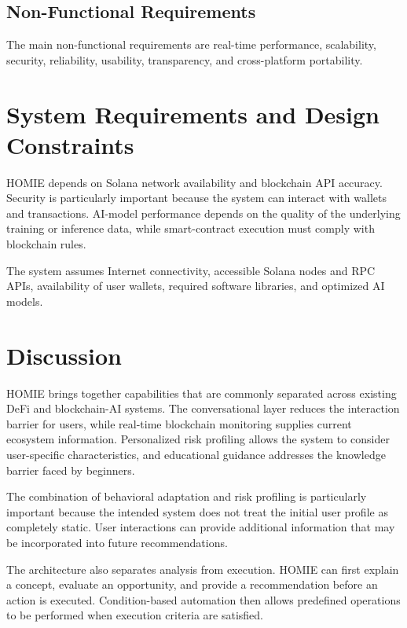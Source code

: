 \documentclass[conference]{IEEEtran}
\begin{document}
\subsection{Non-Functional Requirements}

The main non-functional requirements are real-time performance, scalability, security, reliability, usability, transparency, and cross-platform portability.

\section{System Requirements and Design Constraints}

HOMIE depends on Solana network availability and blockchain API accuracy. Security is particularly important because the system can interact with wallets and transactions. AI-model performance depends on the quality of the underlying training or inference data, while smart-contract execution must comply with blockchain rules.

The system assumes Internet connectivity, accessible Solana nodes and RPC APIs, availability of user wallets, required software libraries, and optimized AI models.

\section{Discussion}

HOMIE brings together capabilities that are commonly separated across existing DeFi and blockchain-AI systems. The conversational layer reduces the interaction barrier for users, while real-time blockchain monitoring supplies current ecosystem information. Personalized risk profiling allows the system to consider user-specific characteristics, and educational guidance addresses the knowledge barrier faced by beginners.

The combination of behavioral adaptation and risk profiling is particularly important because the intended system does not treat the initial user profile as completely static. User interactions can provide additional information that may be incorporated into future recommendations.

The architecture also separates analysis from execution. HOMIE can first explain a concept, evaluate an opportunity, and provide a recommendation before an action is executed. Condition-based automation then allows predefined operations to be performed when execution criteria are satisfied.
\end{document}
